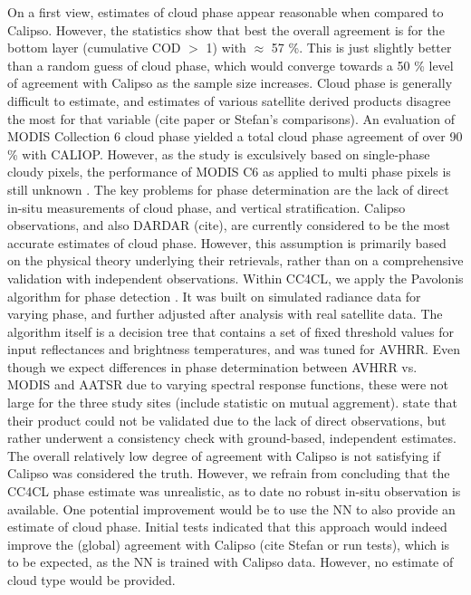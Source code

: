 On a first view, estimates of cloud phase appear reasonable when compared to Calipso. However, the statistics show that best the overall agreement is for the bottom layer (cumulative COD $>$ 1) with $\approx$ 57 \%. This is just slightly better than a random guess of cloud phase, which would converge towards a 50 \% level of agreement with Calipso as the sample size increases. Cloud phase is generally difficult to estimate, and estimates of various satellite derived products disagree the most for that variable (cite paper or Stefan's comparisons). An evaluation of MODIS Collection 6 cloud phase yielded a total cloud phase agreement of over 90 \% with CALIOP. However, as the study is exculsively based on single-phase cloudy pixels, the performance of MODIS C6 as applied to multi phase pixels is still unknown \citep{Marchant16}. The key problems for phase determination are the lack of direct in-situ measurements of cloud phase, and vertical stratification. Calipso observations, and also DARDAR (cite), are currently considered to be the most accurate estimates of cloud phase. However, this assumption is primarily based on the physical theory underlying their retrievals, rather than on a comprehensive validation with independent observations. Within CC4CL, we apply the Pavolonis algorithm for phase detection \citep{Pavolonis05}. It was built on simulated radiance data for varying phase, and further adjusted after analysis with real satellite data. The algorithm itself is a decision tree that contains a set of fixed threshold values for input reflectances and brightness temperatures, and was tuned for AVHRR. Even though we expect differences in phase determination between AVHRR vs. MODIS and AATSR due to varying spectral response functions, these were not large for the three study sites (include statistic on mutual aggrement). \citet{Pavolonis05} state that their product could not be validated due to the lack of direct observations, but rather underwent a consistency check with ground-based, independent estimates. The overall relatively low degree of agreement with Calipso is not satisfying if Calipso was considered the truth. However, we refrain from concluding that the CC4CL phase estimate was unrealistic, as to date no robust in-situ observation is available. One potential improvement would be to use the NN to also provide an estimate of cloud phase. Initial tests indicated that this approach would indeed improve the (global) agreement with Calipso (cite Stefan or run tests), which is to be expected, as the NN is trained with Calipso data. However, no estimate of cloud type would be provided.



